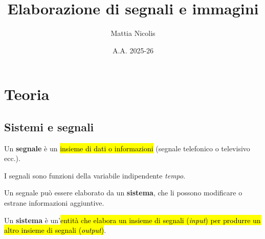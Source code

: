 \documentclass[a4paper, 12pt]{book}
\title{\textbf{Elaborazione di segnali e immagini}}
\author{Mattia Nicolis}
\date{A.A. 2025-26}
\begin{document}
    \maketitle

    \tableofcontents
    \markboth{}{}

    \chapter*{Teoria}

    \section*{Sistemi e segnali}

    \begin{tcolorbox}[
      colback=cyan!5!white,
      colframe=blue!50!black,
      title=\textbf{Segnale},
      coltitle=white,
      fonttitle=\bfseries,
      arc=3mm,
      boxrule=0.5pt,
      enhanced,
      breakable
    ]
      Un \textbf{segnale} è un \hl{insieme di dati o informazioni} (segnale telefonico o televisivo ecc.).
    \end{tcolorbox}

    \vspace{2mm}

    I segnali sono funzioni della variabile indipendente \textit{tempo}.

    Un segnale può essere elaborato da un \textbf{sistema}, che li possono modificare o estrane informazioni aggiuntive.

    \vspace{2mm}

    \begin{tcolorbox}[
      colback=cyan!5!white,
      colframe=blue!50!black,
      title=\textbf{Sistema},
      coltitle=white,
      fonttitle=\bfseries,
      arc=3mm,
      boxrule=0.5pt,
      enhanced,
      breakable
    ]
      Un \textbf{sistema} è un'\hl{entità che elabora un insieme di segnali (\textit{input}) per produrre un altro insieme di segnali (\textit{output})}.
    \end{tcolorbox}
\end{document}
